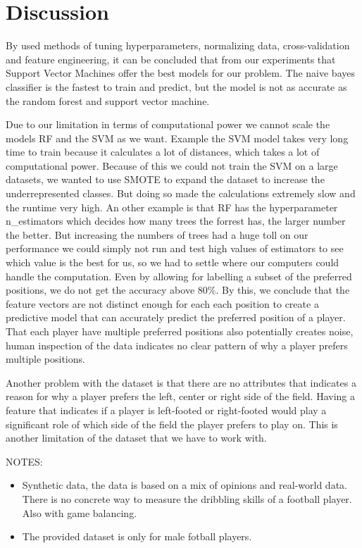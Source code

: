 \section{Discussion}

By used methods of tuning hyperparameters, normalizing data, cross-validation and feature engineering, it can be concluded that from our experiments that Support Vector Machines offer the best models for our problem. The naive bayes classifier is the fastest to train and predict, but the model is not as accurate as the random forest and support vector machine. 
\par
Due to our limitation in terms of computational power we cannot scale the models RF and the SVM as we want. 
Example the SVM model takes very long time to train because it calculates a lot of distances, which takes a lot of computational power. 
Because of this we could not train the SVM on a large datasets, we wanted to use SMOTE to expand the dataset to increase the underrepresented classes.
But doing so made the calculations extremely slow and the runtime very high. An other example is that RF has the hyperparameter n\_estimators which decides how many trees the forrest has, the larger number the better. 
But increasing the numbers of trees had a huge toll on our performance we could simply not run and test high values of estimators to see which value is the best for us, so we had to settle where our computers could handle the computation.
Even by allowing for labelling a subset of the preferred positions, we do not get the accuracy above $80\%$. By this, we conclude that the feature vectors are not distinct enough for each each position to create a predictive model that can accurately predict the preferred position of a player. That each player have multiple preferred positions also potentially creates noise, human inspection of the data indicates no clear pattern of why a player prefers multiple positions.
\par
Another problem with the dataset is that there are no attributes that indicates a reason for why a player prefers the left, center or right side of the field. Having a feature that indicates if a player is left-footed or right-footed would play a significant role of which side of the field the player prefers to play on. This is another limitation of the dataset that we have to work with. 

NOTES:
\begin{itemize}
    \item Synthetic data, the data is based on a mix of opinions and real-world data. There is no concrete way to measure the dribbling skills of a football player. Also with game balancing.
    \item The provided dataset is only for male fotball players.
\end{itemize}








